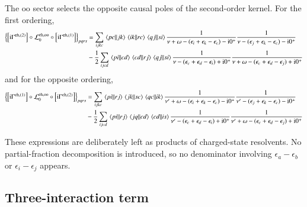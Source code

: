 \documentclass[aip,jcp,reprint,noshowkeys,superscriptaddress]{revtex4-1}
\newcommand{\eps}{\epsilon}
\newcommand{\ii}{\mathrm{i}}
\newcommand{\eh}{\text{eh}}
\begin{document}
\begin{widetext}
The $\text{oo}$ sector selects the opposite causal poles of the second-order kernel.
For the first ordering,
\begin{equation}
    \begin{split}
    \left\{
    \left[\ii\Gamma^{\eh,(2)}\right]
    \circ\mathcal L_0^{\eh,\text{oo}}
    \circ\left[\ii\Gamma^{\eh,(1)}\right]
    \right\}_{pqrs}
    & =
    \sum_{ijkc}
    \mel{pc}{}{jk}\mel{ik}{}{rc}\mel{qj}{}{si}
    \frac{1}{\nu+\omega-(\eps_i+\eps_k-\eps_c)-\ii0^+}
    \frac{1}{\nu-(\eps_j+\eps_k-\eps_c)-\ii0^+}
    \\
    &-
    \frac12
    \sum_{ijcd}
    \mel{pi}{}{cd}\mel{cd}{}{rj}\mel{qj}{}{si}
    \frac{1}{\nu-(\eps_c+\eps_d-\eps_i)+\ii0^+}
    \frac{1}{\nu+\omega-(\eps_c+\eps_d-\eps_j)+\ii0^+}
    \end{split}
    \label{eq:Phi_eh_third_oo_left}
\end{equation}
and for the opposite ordering,
\begin{equation}
    \begin{split}
    \left\{
    \left[\ii\Gamma^{\eh,(1)}\right]
    \circ\mathcal L_0^{\eh,\text{oo}}
    \circ\left[\ii\Gamma^{\eh,(2)}\right]
    \right\}_{pqrs}
    & =
    \sum_{ijkc}
    \mel{pi}{}{rj}\mel{jk}{}{sc}\mel{qc}{}{ik}
    \frac{1}{\nu'+\omega-(\eps_i+\eps_k-\eps_c)-\ii0^+}
    \frac{1}{\nu'-(\eps_j+\eps_k-\eps_c)-\ii0^+}
    \\
    &-
    \frac12
    \sum_{ijcd}
    \mel{pi}{}{rj}\mel{jq}{}{cd}\mel{cd}{}{is}
    \frac{1}{\nu'-(\eps_c+\eps_d-\eps_i)+\ii0^+}
    \frac{1}{\nu'+\omega-(\eps_c+\eps_d-\eps_j)+\ii0^+}
    \end{split}
    \label{eq:Phi_eh_third_oo_right}
\end{equation}
\end{widetext}
These expressions are deliberately left as products of charged-state
resolvents.
No partial-fraction decomposition is introduced, so no denominator involving
$\eps_a-\eps_b$ or $\eps_i-\eps_j$ appears.

\subsection{Three-interaction term}
\end{document}

